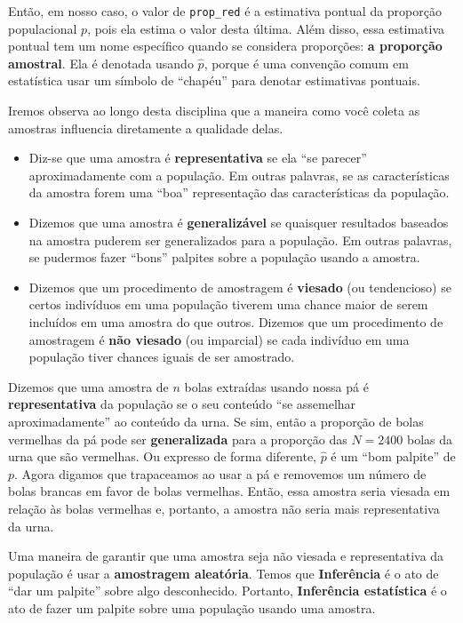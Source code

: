 \documentclass[
  letterpaper,
  DIV=11,
  numbers=noendperiod]{scrreprt}
\begin{document}
Então, em nosso caso, o valor de \texttt{prop\_red} é a estimativa
pontual da proporção populacional \(p\), pois ela estima o valor desta
última. Além disso, essa estimativa pontual tem um nome específico
quando se considera proporções: \textbf{a proporção amostral}. Ela é
denotada usando \(\hat{p}\), porque é uma convenção comum em estatística
usar um símbolo de ``chapéu'' para denotar estimativas pontuais.

Iremos observa ao longo desta disciplina que a maneira como você coleta
as amostras influencia diretamente a qualidade delas.

\begin{itemize}
\item
  Diz-se que uma amostra é \textbf{representativa} se ela ``se parecer''
  aproximadamente com a população. Em outras palavras, se as
  características da amostra forem uma ``boa'' representação das
  características da população.
\item
  Dizemos que uma amostra é \textbf{generalizável} se quaisquer
  resultados baseados na amostra puderem ser generalizados para a
  população. Em outras palavras, se pudermos fazer ``bons'' palpites
  sobre a população usando a amostra.
\item
  Dizemos que um procedimento de amostragem é \textbf{viesado} (ou
  tendencioso) se certos indivíduos em uma população tiverem uma chance
  maior de serem incluídos em uma amostra do que outros. Dizemos que um
  procedimento de amostragem é \textbf{não viesado} (ou imparcial) se
  cada indivíduo em uma população tiver chances iguais de ser amostrado.
\end{itemize}

Dizemos que uma amostra de \(n\) bolas extraídas usando nossa pá é
\textbf{representativa} da população se o seu conteúdo ``se assemelhar
aproximadamente'' ao conteúdo da urna. Se sim, então a proporção de
bolas vermelhas da pá pode ser \textbf{generalizada} para a proporção
das \(N = 2400\) bolas da urna que são vermelhas. Ou expresso de forma
diferente, \(\hat{p}\) é um ``bom palpite'' de \(p\). Agora digamos que
trapaceamos ao usar a pá e removemos um número de bolas brancas em favor
de bolas vermelhas. Então, essa amostra seria viesada em relação às
bolas vermelhas e, portanto, a amostra não seria mais representativa da
urna.

Uma maneira de garantir que uma amostra seja não viesada e
representativa da população é usar a \textbf{amostragem aleatória}.
Temos que \textbf{Inferência} é o ato de ``dar um palpite'' sobre algo
desconhecido. Portanto, \textbf{Inferência estatística} é o ato de fazer
um palpite sobre uma população usando uma amostra.
\end{document}
